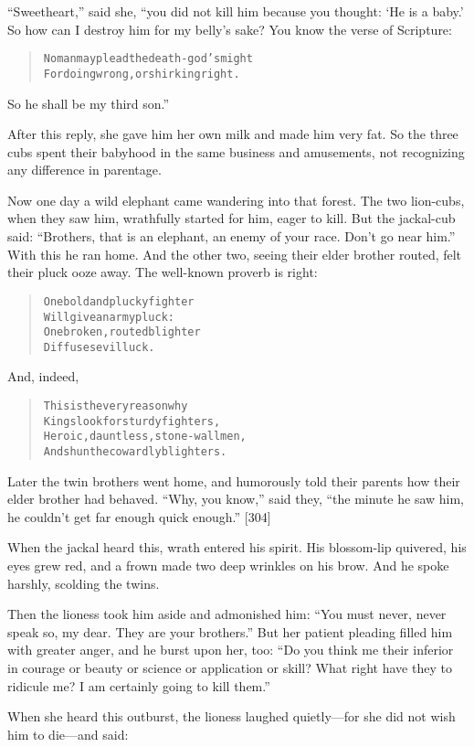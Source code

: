 \documentclass[article, twoside, 14pt]{memoir}
\renewenvironment{verbatim}{%
\begin{quote}%
\vskip -10pt%
\begin{alltt}\normalfont\large}{\end{alltt}%
\end{quote}%
\vskip -10pt
} %
\begin{document}
``Sweetheart,'' said she, “you did not kill him because you
thought: `He is a baby.' So how can I destroy him for my belly's
sake? You know the verse of Scripture:

\begin{verbatim}
No man may plead the death-god's might
For doing wrong, or shirking right.
\end{verbatim}
So he shall be my third son.”

After this reply, she gave him her own milk and made him very fat.
So the three cubs spent their babyhood in the same business and
amusements, not recognizing any difference in parentage.

Now one day a wild elephant came wandering into that forest. The
two lion-cubs, when they saw him, wrathfully started for him, eager
to kill. But the jackal-cub said:
``Brothers, that is an elephant, an enemy of your race. Don't go near him.''
With this he ran home. And the other two, seeing their elder
brother routed, felt their pluck ooze away. The well-known proverb
is right:

\begin{verbatim}
One bold and plucky fighter
    Will give an army pluck:
One broken, routed blighter
    Diffuses evil luck.
\end{verbatim}
And, indeed,

\begin{verbatim}
This is the very reason why
    Kings look for sturdy fighters,
Heroic, dauntless, stone-wall men,
    And shun the cowardly blighters.
\end{verbatim}
Later the twin brothers went home, and humorously told their
parents how their elder brother had behaved. ``Why, you know,''
said they,
``the minute he saw him, he couldn't get far enough quick enough.''
[304]

When the jackal heard this, wrath entered his spirit. His
blossom-lip quivered, his eyes grew red, and a frown made two deep
wrinkles on his brow. And he spoke harshly, scolding the twins.

Then the lioness took him aside and admonished him:
``You must never, never speak so, my dear. They are your brothers.''
But her patient pleading filled him with greater anger, and he
burst upon her, too:
``Do you think me their inferior in courage or beauty or science or application or skill? What right have they to ridicule me? I am certainly going to kill them.''

When she heard this outburst, the lioness laughed quietly---for she
did not wish him to die---and said:
\end{document}
